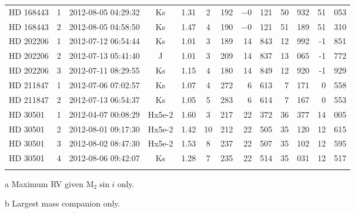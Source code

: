 \begin{table*}
\begin{threeparttable}[b]
\begin{tabular}{l c c c c c c r@{.}l r@{.}l r@{.}l}
                {HD 168443} & 1 & 2012-08-05 04:29:32 & Ks     		& 1.31 		& 2& 192 & $-$0   & 121 & 50 & 932\tnote{a,b}  & 51&053\tnote{a,b} \\ %
                {HD 168443} & 2 & 2012-08-05 04:58:50 & Ks     		& 1.47 		& 4 & 190 & $-$0   & 121 & 51 & 189 \tnote{a,b} & 51&310\tnote{a,b} \\ %
                {HD 202206} & 1 & 2012-07-12 06:54:44 & Ks     		& 1.01 		& 3& 189 & 14      & 843 & 12 & 992\tnote{b}  & -1&851 \\ %
                {HD 202206} & 2 & 2012-07-13 05:41:40 & J       	  & 1.01 	  & 3 & 209 & 14      & 837 & 13 & 065\tnote{b}  & -1&772 \\ %
                {HD 202206} & 3 & 2012-07-11 08:29:55 & Ks     		& 1.15		& 4& 180 & 14      & 849 & 12 & 920\tnote{b}  & -1&929 \\ %
                {HD 211847} & 1 & 2012-07-06 07:02:57 & Ks     		& 1.07 		& 4& 272 & 6        & 613 & 7   & 171 & 0& 558\\ %
                {HD 211847} & 2 & 2012-07-13 06:54:37 & Ks     		& 1.05 		& 5& 283 & 6        & 614 & 7   & 167 & 0&553 \\ %
                {HD 30501}  & 1 & 2012-04-07 00:08:29 & Hx5e-2 	 & 1.60 	 & 3& 217 & 22      &  372 & 36 & 377 & 14&005 \\ %
                {HD 30501}  & 2 & 2012-08-01 09:17:30 & Hx5e-2    & 1.42     & 10& 212 & 22      & 505 & 35  & 120 & 12&615 \\ %
                {HD 30501}  & 3 & 2012-08-02 08:47:30 & Hx5e-2 	 & 1.53 	 & 8& 237 & 22      & 507 &  35 & 102 & 12&595 \\ %
                {HD 30501}  & 4 & 2012-08-06 09:42:07 & Ks     		 & 1.28 	 & 7& 235& 22      & 514 & 35 & 031 & 12&517 \\ %
                \bottomrule
                & & & & 
        \end{tabular}
        \label{tab:observations}
        \begin{tablenotes}
          \item  [a]{Maximum RV given \(\textrm{M}_2\sin{i}\) only.}
          \item  [b]{Largest mass companion only.}
        \end{tablenotes}
    \end{threeparttable}

\end{table*}